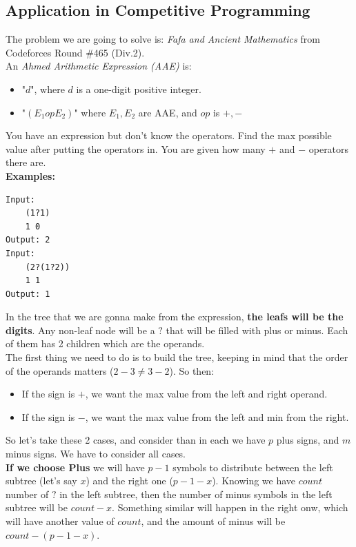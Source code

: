 \documentclass{IEEEtran}
\begin{document}
        \subsection{Application in Competitive Programming}
            The problem we are going to solve is: \textit{Fafa and Ancient Mathematics} from Codeforces Round \#465 (Div.2).\\
            An \textit{Ahmed Arithmetic Expression (AAE)} is:
            \begin{itemize}
                \item "$d$", where $d$ is a one-digit positive integer.
                \item "$(E_1opE_2)$" where $E_1,E_2$ are AAE, and $op$ is $+,-$
            \end{itemize}
            You have an expression but don't know the operators. Find the max possible value after putting the operators in. You are given how many $+$ and $-$ operators there are.\\
            \textbf{Examples:}
            \begin{lstlisting}
Input:
    (1?1)
    1 0
Output: 2
Input: 
    (2?(1?2))
    1 1
Output: 1
            \end{lstlisting}
            In the tree that we are gonna make from the expression, \textbf{the leafs will be the digits}. Any non-leaf node will be a $?$ that will be filled with plus or minus. Each of them has 2 children which are the operands.\\
            The first thing we need to do is to build the tree, keeping in mind that the order of the operands matters ($2-3\neq 3-2$). So then:
            \begin{itemize}
                \item If the sign is $+$, we want the max value from the left and right operand.
                \item If the sign is $-$, we want the max value from the left and min from the right.
            \end{itemize}
            So let's take these 2 cases, and consider than in each we have $p$ plus signs, and $m$ minus signs. We have to consider all cases.\\
            \textbf{If we choose Plus} we will have $p - 1$ symbols to distribute between the left subtree (let's say $x$) and the right one ($p-1-x$). Knowing we have $count$ number of $?$ in the left subtree, then the number of minus symbols in the left subtree will be $count - x$. Something similar will happen in the right onw, which will have another value of $count$, and the amount of minus will be $count - (p-1-x)$.\\
\end{document}
